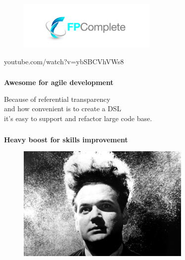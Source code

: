 \documentclass[usenames,dvipsnames, 18pt, compress, aspectratio=169]{beamer}
\begin{document}
\begin{frame}
    \frametitle{}
    \begin{center}
    \begin{figure}
        \includegraphics[width=0.6\textwidth,center]{fp-complete.jpg}
    \end{figure}
    youtube.com/watch?v=ybSBCVhVWs8
    \end{center}
\end{frame}

\begin{frame}
    \frametitle{}
    \begin{center}
        \textbf{Awesome for agile development}\\
    \end{center}
    \begin{flushleft}
        Because of referential transparency\\
        and how convenient is to create a DSL\\
        it's easy to support and refactor large code base.
    \end{flushleft}
\end{frame}

\begin{frame}
    \frametitle{}
    \begin{center}
    \textbf{Heavy boost for skills improvement}
    \begin{figure}
        \includegraphics[width=0.75\textwidth,center]{eraserhead.jpg}
    \end{figure}
    \end{center}
\end{frame}
\end{document}
